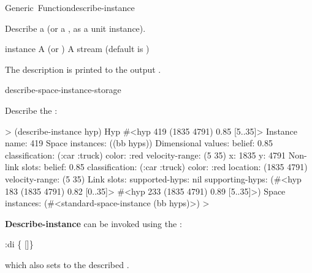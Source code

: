 \documentclass[10pt,twoside,english,pdftex]{article}
\begin{document}
\begin{functiondoc}{Generic~Function}{describe-instance}%
  {}
%
%
%

\fnsyntax

\fnpurpose Describe a  (or a
, as a unit instance).

\fnmethods
{}%
 {\code{(} 
    }

\fnpackage {}

\fnmodule {}

%
\fnargs
\begin{args}{instance}
\arg[instance] A  (or )
\arg[stream] A stream (default is )
\end{args}

\fndescription
The description is printed to the output .

\begin{alsos}{describe-space-instance-storage}
\end{alsos}

\fnexample
Describe the  :
%
\W\supp
\begin{example}
  > (describe-instance hyp)
  Hyp #<hyp 419 (1835 4791) 0.85 [5..35]>
    Instance name: 419
    Space instances: ((bb hyps))
    Dimensional values:
      belief:  0.85
      classification:  (:car :truck)
      color:  :red
      velocity-range:  (5 35)
      x:  1835
      y:  4791
    Non-link slots:
      belief:  0.85
      classification:  (:car :truck)
      color:  :red
      location:  (1835 4791)
      velocity-range:  (5 35)
    Link slots:
      supported-hyps:  nil
      supporting-hyps:  (#<hyp 183 (1835 4791) 0.82 [0..35]>
                         #<hyp 233 (1835 4791) 0.89 [5..35]>)
    Space instances: (#<standard-space-instance (bb hyps)>)
  >
\end{example}

\replnote 
%
%
%
\textbf{Describe-instance} can be invoked using the :
%
\W\supp
\begin{example}
  :di  \vbar \{ \textrm{[}\textrm{]}\}
\end{example}
%
which also sets \code{=} to the described .

\end{functiondoc}
\end{document}
